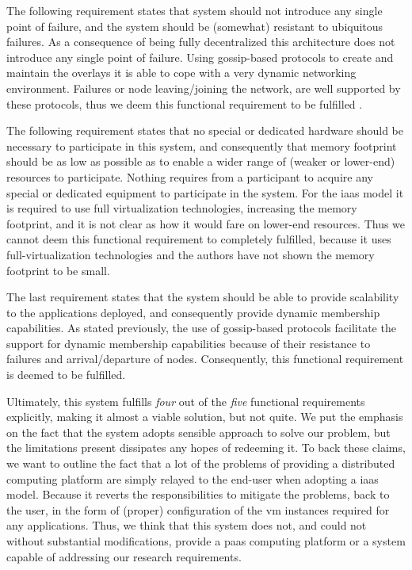 \documentclass[12pt, titlepage]{uo_temp}
\begin{document}
     The following requirement states that system should not introduce any single point of
     failure, and the system should be (somewhat) resistant to ubiquitous failures.  As a
     consequence of being fully decentralized this architecture does not introduce any
     single point of failure. Using gossip-based protocols to create and maintain the
     overlays it is able to cope with a very dynamic networking environment. Failures or
     node leaving/joining the network, are well supported by these protocols, thus we deem
     this functional requirement to be fulfilled \cite{p2p_collab}.

     The following requirement states that no special or dedicated hardware should be
     necessary to participate in this system, and consequently that memory footprint
     should be as low as possible as to enable a wider range of (weaker or lower-end)
     resources to participate. Nothing requires from a participant to acquire any special
     or dedicated equipment to participate in the system. For the \gls{iaas} model it is
     required to use full virtualization technologies, increasing the memory footprint,
     and it is not clear as how it would fare on lower-end resources. Thus we cannot deem
     this functional requirement to completely fulfilled, because it uses
     full-virtualization technologies and the authors have not shown the memory footprint
     to be small.

     The last requirement states that the system should be able to provide scalability to
     the applications deployed, and consequently provide dynamic membership capabilities.
     As stated previously, the use of gossip-based protocols facilitate the support for
     dynamic membership capabilities because of their resistance to failures and
     arrival/departure of nodes. Consequently, this functional requirement is deemed to be
     fulfilled.

     Ultimately, this system fulfills \emph{four} out of the \emph{five} functional
     requirements explicitly, making it almost a viable solution, but not quite. We put
     the emphasis on the fact that the system adopts sensible approach to solve our
     problem, but the limitations present dissipates any hopes of redeeming it. To back
     these claims, we want to outline the fact that a lot of the problems of providing a
     distributed computing platform are simply relayed to the end-user when adopting a
     \gls{iaas} model. Because it reverts the responsibilities to mitigate the problems,
     back to the user, in the form of (proper) configuration of the \gls{vm} instances
     required for any applications. Thus, we think that this system does not, and could
     not without substantial modifications, provide a \gls{paas} computing platform or a
     system capable of addressing our research requirements.
\end{document}
